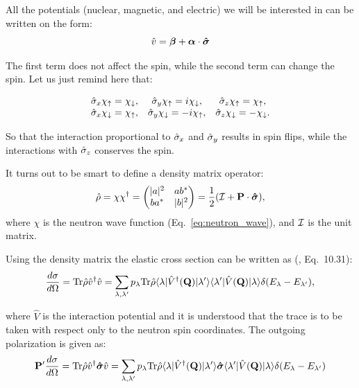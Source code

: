 All the potentials (nuclear, magnetic, and electric) we will be interested in
can be written on the form:
\begin{equation}
  \label{eq:general_pot}
  \hat{v} = \boldsymbol{\beta} + \boldsymbol{\alpha} \cdot \boldsymbol{\hat\sigma}
\end{equation}

The first term does not affect the spin, while the second term can
change the spin. Let us just remind here that:

\begin{equation}
  \label{eq:pauli_rules}
  \begin{matrix}
    \hat\sigma_x \chi_\uparrow = \chi_\downarrow, &
    \hat\sigma_y \chi_\uparrow = i\chi_\downarrow, &
    \hat\sigma_z \chi_\uparrow = \chi_\uparrow, \\
    \hat\sigma_x \chi_\downarrow = \chi_\uparrow, &
    \hat\sigma_y \chi_\downarrow = -i\chi_\uparrow, &
    \hat\sigma_z \chi_\downarrow = -\chi_\downarrow.
  \end{matrix}
\end{equation}

So that the interaction proportional to $\hat\sigma_x$ and $\hat\sigma_y$
results in spin flips, while the interactions with $\hat\sigma_z$
conserves the spin.

It turns out to be smart to define a density matrix operator:
\begin{equation}
  \hat\rho = \chi \chi^\dagger =
  \left( \begin{matrix}
    |a|^2 & ab^\ast \\
    ba^\ast & |b|^2
  \end{matrix} \right)
  = \frac{1}{2}({\cal I}+\mathbf{P} \cdot \boldsymbol{\hat\sigma}),
\end{equation}
where $\chi$ is the neutron wave function (Eq.~\ref{eq:neutron_wave}),
and ${\cal I}$ is the unit matrix.

Using the density matrix the elastic cross section can be written as
(\cite{lovesey84}, Eq.~10.31):
\begin{equation}
  \label{eq:master_sigma}
  \frac{d\sigma}{d\Omega} = \text{Tr} \hat\rho \hat{v}^\dagger \hat{v}
  = \sum_{\lambda, \lambda'} p_\lambda \text{Tr} \hat\rho
  \langle \lambda | \hat{V}^\dagger(\mathbf{Q}) | \lambda' \rangle
  \langle \lambda' | \hat{V}(\mathbf{Q}) | \lambda \rangle
  \delta(E_\lambda - E_{\lambda'}),
\end{equation}

where $\hat{V}$ is the interaction potential and it is understood that
the trace is to be taken with respect only to the neutron spin
coordinates. The outgoing polarization is given as:
\begin{equation}
  \label{eq:master_pol}
  \mathbf{P}' \frac{d\sigma}{d\Omega} =
  \text{Tr} \hat\rho \hat{v}^\dagger \boldsymbol{\hat\sigma} \hat{v}
  = \sum_{\lambda, \lambda'} p_\lambda \text{Tr} \hat\rho
  \langle \lambda | \hat{V}^\dagger(\mathbf{Q}) | \lambda' \rangle
  \boldsymbol{\hat\sigma}
  \langle \lambda' | \hat{V}(\mathbf{Q}) | \lambda \rangle
  \delta(E_\lambda - E_{\lambda'})
\end{equation}

